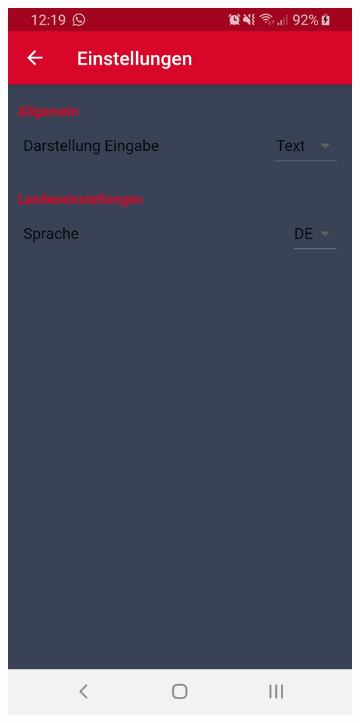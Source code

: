 	\begin{figure}[H]
		\centering
		\begin{subfigure}[b]{0.45\textwidth}
			\centering
			\includegraphics[width=1\textwidth]{../include/images/usertests/colorSettings/before}

\end{subfigure}
\end{figure}
